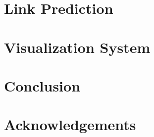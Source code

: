 \documentclass[11pt]{article}
\begin{document}
\section{Link Prediction}

\section{Visualization System}

\section{Conclusion}

\section*{Acknowledgements}


% 
% 



\end{document}

